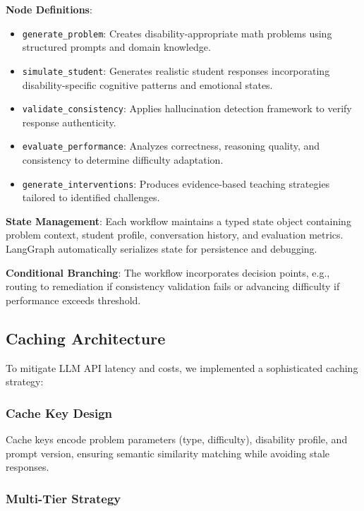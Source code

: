 \documentclass[11pt]{article}
\begin{document}
\textbf{Node Definitions}:
\begin{itemize}
    \item \texttt{generate\_problem}: Creates disability-appropriate math problems using structured prompts and domain knowledge.
    
    \item \texttt{simulate\_student}: Generates realistic student responses incorporating disability-specific cognitive patterns and emotional states.
    
    \item \texttt{validate\_consistency}: Applies hallucination detection framework to verify response authenticity.
    
    \item \texttt{evaluate\_performance}: Analyzes correctness, reasoning quality, and consistency to determine difficulty adaptation.
    
    \item \texttt{generate\_interventions}: Produces evidence-based teaching strategies tailored to identified challenges.
\end{itemize}

\textbf{State Management}: Each workflow maintains a typed state object containing problem context, student profile, conversation history, and evaluation metrics. LangGraph automatically serializes state for persistence and debugging.

\textbf{Conditional Branching}: The workflow incorporates decision points, e.g., routing to remediation if consistency validation fails or advancing difficulty if performance exceeds threshold.

\subsection{Caching Architecture}

To mitigate LLM API latency and costs, we implemented a sophisticated caching strategy:

\subsubsection{Cache Key Design}

Cache keys encode problem parameters (type, difficulty), disability profile, and prompt version, ensuring semantic similarity matching while avoiding stale responses.

\subsubsection{Multi-Tier Strategy}
\end{document}
